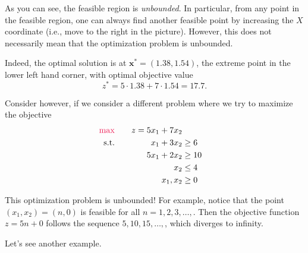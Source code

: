 
As you can see, the feasible region is \emph{unbounded}.  In particular, from any point in the feasible region, one can always find another feasible point by increasing the $X$ coordinate (i.e., move to the right in the picture).   However, this does not necessarily mean that the optimization problem is unbounded.

Indeed, the optimal solution is at $\mathbf{x}^* = (1.38, 1.54)$, the extreme point in the lower left hand corner, 
with optimal objective value
$$
z^* = 5 \cdot 1.38 + 7\cdot 1.54 = 17.7.
$$




Consider however, if we consider a different problem where we try to maximize the objective
\begin{align*}
{\color{red} \max }\quad && z = 5x_1 + 7x_2  \\ 
\text{s.t.} \quad && x_1 + 3x_2 &\geq 6 \\ 
&& 5x_1 + 2x_2 &\geq 10 \\ 
&& x_2 &\leq 4 \\ 
&& x_1, x_2 &\geq 0 
\end{align*}

\begin{solution}
This optimization problem is unbounded!  For example, notice that the point $(x_1,x_2) = (n,0)$ is feasible for all $n=1,2,3,\dots,$.   Then the objective function $z = 5n + 0$ follows the sequence $5, 10, 15, \dots,$, which diverges to infinity.   
\end{solution}


Let's see another example.

